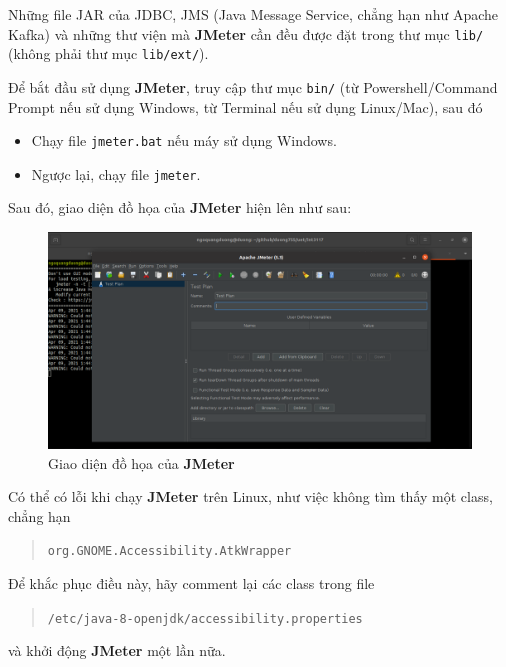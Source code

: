 \documentclass[10pt]{report}
\newcommand{\jmeter}{\textbf{JMeter}}
\begin{document}
\par Những file JAR của JDBC, JMS (Java Message Service, chẳng hạn như Apache Kafka) và những thư viện mà \jmeter{} cần đều được đặt trong thư mục \texttt{lib/} (không phải thư mục \texttt{lib/ext/}).

\par Để bắt đầu sử dụng \jmeter{}, truy cập thư mục \texttt{bin/} (từ Powershell/Command Prompt nếu sử dụng Windows, từ Terminal nếu sử dụng Linux/Mac), sau đó
\begin{itemize}[itemsep=0pt]
  \item Chạy file \texttt{jmeter.bat} nếu máy sử dụng Windows.
  \item Ngược lại, chạy file \texttt{jmeter}.
\end{itemize}

\par Sau đó, giao diện đồ họa của \jmeter{} hiện lên như sau:

\FloatBarrier{}
\begin{figure}[htp]
  \centering
  \includegraphics[scale=0.33]{jmeter-gui.png}
  \caption{Giao diện đồ họa của \jmeter{}}
\end{figure}
\FloatBarrier{}

\par Có thể có lỗi khi chạy \jmeter{} trên Linux, như việc không tìm thấy một class, chẳng hạn
\begin{quotation}
\texttt{org.GNOME.Accessibility.AtkWrapper}
\end{quotation}

\par Để khắc phục điều này, hãy comment lại các class trong file
\begin{quotation}
\texttt{/etc/java-8-openjdk/accessibility.properties}
\end{quotation}
\par và khởi động \jmeter{} một lần nữa.
\end{document}
